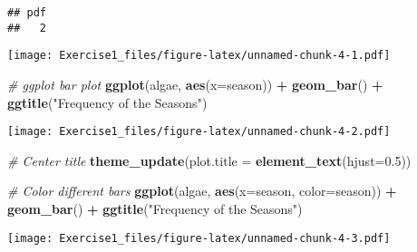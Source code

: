\documentclass[
]{article}
\newenvironment{Shaded}{\begin{snugshade}}{\end{snugshade}}
\newcommand{\AttributeTok}[1]{\textcolor[rgb]{0.13,0.29,0.53}{#1}}
\newcommand{\CommentTok}[1]{\textcolor[rgb]{0.56,0.35,0.01}{\textit{#1}}}
\newcommand{\FloatTok}[1]{\textcolor[rgb]{0.00,0.00,0.81}{#1}}
\newcommand{\FunctionTok}[1]{\textcolor[rgb]{0.13,0.29,0.53}{\textbf{#1}}}
\newcommand{\NormalTok}[1]{#1}
\newcommand{\OtherTok}[1]{\textcolor[rgb]{0.56,0.35,0.01}{#1}}
\newcommand{\SpecialCharTok}[1]{\textcolor[rgb]{0.81,0.36,0.00}{\textbf{#1}}}
\newcommand{\StringTok}[1]{\textcolor[rgb]{0.31,0.60,0.02}{#1}}
\begin{document}
\begin{verbatim}
## pdf 
##   2
\end{verbatim}

\begin{Shaded}
\end{Shaded}

\texttt{[image: Exercise1\_files/figure-latex/unnamed-chunk-4-1.pdf]}

\begin{Shaded}
\begin{Highlighting}[]
\CommentTok{\# ggplot bar plot}
\FunctionTok{ggplot}\NormalTok{(algae, }\FunctionTok{aes}\NormalTok{(}\AttributeTok{x=}\NormalTok{season)) }\SpecialCharTok{+}
\FunctionTok{geom\_bar}\NormalTok{() }\SpecialCharTok{+}
\FunctionTok{ggtitle}\NormalTok{(}\StringTok{"Frequency of the Seasons"}\NormalTok{)}
\end{Highlighting}
\end{Shaded}

\texttt{[image: Exercise1\_files/figure-latex/unnamed-chunk-4-2.pdf]}

\begin{Shaded}
\begin{Highlighting}[]
\CommentTok{\# Center title}
\FunctionTok{theme\_update}\NormalTok{(}\AttributeTok{plot.title =} \FunctionTok{element\_text}\NormalTok{(}\AttributeTok{hjust=}\FloatTok{0.5}\NormalTok{))}

\CommentTok{\# Color different bars}
\FunctionTok{ggplot}\NormalTok{(algae, }\FunctionTok{aes}\NormalTok{(}\AttributeTok{x=}\NormalTok{season, }\AttributeTok{color=}\NormalTok{season)) }\SpecialCharTok{+}
\FunctionTok{geom\_bar}\NormalTok{() }\SpecialCharTok{+}
\FunctionTok{ggtitle}\NormalTok{(}\StringTok{"Frequency of the Seasons"}\NormalTok{)}
\end{Highlighting}
\end{Shaded}

\texttt{[image: Exercise1\_files/figure-latex/unnamed-chunk-4-3.pdf]}
\end{document}
